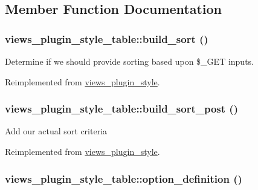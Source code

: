 \subsection{Member Function Documentation}
\hypertarget{classviews__plugin__style__table_3bc31ba52d980f899307aee2d74bef58}{
\subsubsection[{build\_\-sort}]{\setlength{\rightskip}{0pt plus 5cm}views\_\-plugin\_\-style\_\-table::build\_\-sort ()}}
\label{classviews__plugin__style__table_3bc31ba52d980f899307aee2d74bef58}


Determine if we should provide sorting based upon \$\_\-GET inputs. 

Reimplemented from \hyperlink{classviews__plugin__style_13b4b43f813fde038a199d2ec26fc76e}{views\_\-plugin\_\-style}.\hypertarget{classviews__plugin__style__table_00d9e14ac7f545d47a43af3f9d186382}{
\subsubsection[{build\_\-sort\_\-post}]{\setlength{\rightskip}{0pt plus 5cm}views\_\-plugin\_\-style\_\-table::build\_\-sort\_\-post ()}}
\label{classviews__plugin__style__table_00d9e14ac7f545d47a43af3f9d186382}


Add our actual sort criteria 

Reimplemented from \hyperlink{classviews__plugin__style_f59de962f895ccd0b3adf960b908e0bd}{views\_\-plugin\_\-style}.\hypertarget{classviews__plugin__style__table_e3d77e484f3e8ff4e2df07dfcfc44aab}{
\subsubsection[{option\_\-definition}]{\setlength{\rightskip}{0pt plus 5cm}views\_\-plugin\_\-style\_\-table::option\_\-definition ()}}
\label{classviews__plugin__style__table_e3d77e484f3e8ff4e2df07dfcfc44aab}


